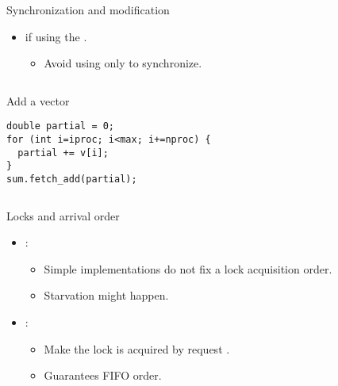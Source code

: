 \begin{frame}[t,fragile]{Synchronization and modification}
\begin{itemize}
  \item {} if using the
        .
    \begin{itemize}
      \item Avoid using  only to synchronize.
    \end{itemize}
\end{itemize}


\begin{columns}

\begin{block}{Add a vector}
\begin{lstlisting}
double partial = 0;
for (int i=iproc; i<max; i+=nproc) {
  partial += v[i];
}
sum.fetch_add(partial);
\end{lstlisting}
\end{block}

\end{columns}
\end{frame}

\begin{frame}[t]{Locks and arrival order}
\begin{itemize}
  \item {}:
    \begin{itemize}
      \item Simple implementations do not fix a lock acquisition order.
      \item Starvation might happen.
    \end{itemize}

  \item {}:
    \begin{itemize}
      \item Make the lock is acquired by request .
      \item Guarantees FIFO order.
    \end{itemize}

\end{itemize}
\end{frame}

